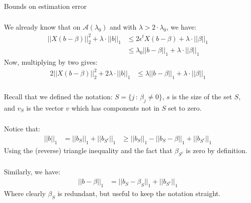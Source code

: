 \begin{frame}[fragile] \frametitle{}

\begin{flushright}
{\color{yaleblue}\sc\fontsize{1cm}{0cm}\selectfont Bounds on estimation error}
\end{flushright}

\end{frame}

\begin{frame}[fragile] \frametitle{}

We already know that on $\mathcal{A}(\lambda_0)$ and with $\lambda > 2 \cdot \lambda_0$, we have:
\begin{align*}
|| X (b - \beta) ||_2^2 + \lambda \cdot || b ||_1 &\leq 2 \epsilon^t X (b - \beta) + \lambda \cdot || \beta ||_1 \\
&\leq \lambda_0 || b - \beta ||_1 + \lambda \cdot || \beta ||_1
\end{align*}
\pause Now, multiplying by two gives:
\begin{align*}
2 || X (b - \beta) ||_2^2 + 2 \lambda \cdot || b ||_1
&\leq \lambda || b - \beta ||_1 + \lambda \cdot || \beta ||_1
\end{align*}

\end{frame}

\begin{frame}[fragile] \frametitle{}

Recall that we defined the notation: $S = \{j \, : \, \beta_j \neq 0\}$, $s$
is the size of the set $S$, and $v_{S}$ is the vector
$v$ which has components not in $S$ set to zero.

\end{frame}

\begin{frame}[fragile] \frametitle{}

Notice that:
\begin{align*}
|| b ||_1 &= || b_S ||_1 + || b_{S^c} ||_1
&\geq || b_S ||_1 - || b_S - \beta ||_1 + || b_{S^c} ||_1
\end{align*}
Using the (reverse) triangle inequality and the fact that $\beta_{S^c}$ is zero
by definition.

\end{frame}

\begin{frame}[fragile] \frametitle{}

Similarly, we have:
\begin{align*}
|| b - \beta ||_1 &= || b_S - \beta_S ||_1 + || b_{S^c} ||_1
\end{align*}
Where clearly $\beta_S$ is redundant, but useful to keep the
notation straight.

\end{frame}

